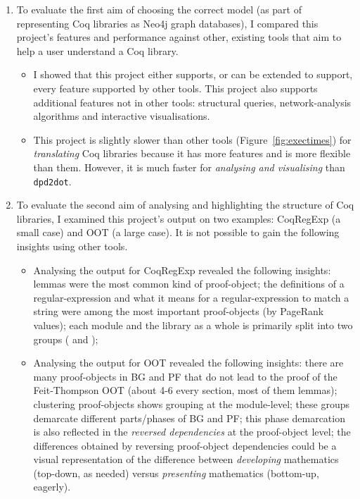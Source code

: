 \begin{enumerate} 

  \item To evaluate the first aim of choosing the correct model (as part of
    representing Coq libraries as Neo4j graph databases), I compared this
    project's features and performance against other, existing tools that aim to
    help a user understand a Coq library. 

    \begin{itemize}

      \item I showed that this project either supports, or can be extended to
        support, every feature supported by other tools. This project also
        supports additional features not in other tools: structural queries,
        network-analysis algorithms and interactive visualisations.

      \item This project is slightly slower than other tools
        (Figure~\ref{fig:exectimes}) for \emph{translating} Coq libraries
        because it has more features and is more flexible than them. However, it
        is much faster for \emph{analysing and visualising} than
        \texttt{dpd2dot}.

    \end{itemize}

  \item To evaluate the second aim of analysing and highlighting the structure
    of Coq libraries, I examined this project's output on two examples:
    CoqRegExp (a small case) and OOT (a large case). It is not possible to gain
    the following insights using other tools.

    \begin{itemize}

      \item Analysing the output for CoqRegExp revealed the following insights:
        lemmas were the most common kind of proof-object; the definitions of a
        regular-expression and what it means for a regular-expression to match a
        string were among the most important proof-objects (by PageRank values);
        each module and the library as a whole is primarily split into two
        groups ( and ); 

      \item Analysing the output for OOT revealed the following insights: there
        are many proof-objects in BG and PF that do not lead to the proof of the
        Feit-Thompson OOT (about 4-6 every section, most of them lemmas);
        clustering proof-objects shows grouping at the module-level; these
        groups demarcate different parts/phases of BG and PF; this phase
        demarcation is also reflected in the \emph{reversed dependencies} at the
        proof-object level; the differences obtained by reversing proof-object
        dependencies could be a visual representation of the difference between
        \emph{developing} mathematics (top-down, as needed) versus
        \emph{presenting} mathematics (bottom-up, eagerly).

    \end{itemize}

\end{enumerate}
